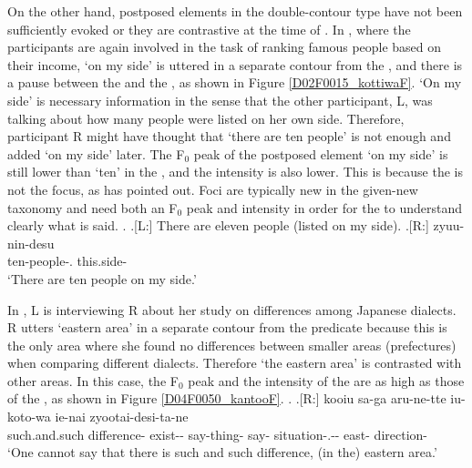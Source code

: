 On the other hand, postposed elements in the double-contour type have not been sufficiently evoked or they are contrastive at the time of .
In \Next, where the participants are again involved in the task of ranking famous people based on their income,
 `on my side' is uttered in a separate contour from the , and there is a pause between the  and the , as shown in Figure \ref{D02F0015_kottiwaF}.
`On my side' is necessary information in the sense that
the other participant, L, was talking about how many people were listed on her own side.
Therefore, participant R might have thought that `there are ten people' is not enough and added `on my side' later.
The F$_{0}$ peak of the postposed element  `on my side' is still lower than  `ten' in the ,
and the intensity is also lower.
This is because the  is not the focus, as  has pointed out.
Foci are typically new in the given-new taxonomy and need both an F$_{0}$ peak and intensity in order for the  to understand clearly what is said.
%
\ex.\label{D02F0015_kottiwa}
 \a.[L:] There are eleven people (listed on my side).
 \bg.[R:] zyuu-nin-desu  \\
 		ten-people-. this.side- \\
		`There are ten people on my side.'


\newpage
In \Next, L is interviewing R about her study on differences among Japanese dialects.
R utters `eastern area' in a separate contour from the predicate because this is the only area where she found no differences between smaller areas (prefectures) when comparing different dialects.
Therefore `the eastern area' is contrasted with other areas.
In this case, the F$_{0}$ peak and the intensity of the  are as high as those of the ,
as shown in Figure \ref{D04F0050_kantooF}.
%
\ex.\label{D04F0050_kantoo}
 \ag.[R:] kooiu sa-ga aru-ne-tte iu-koto-wa ie-nai zyootai-desi-ta-ne   \\
 	such.and.such difference- exist-- say-thing- say- situation-.-- east- direction- \\
	`One cannot say that there is such and such difference, (in the) eastern area.'

